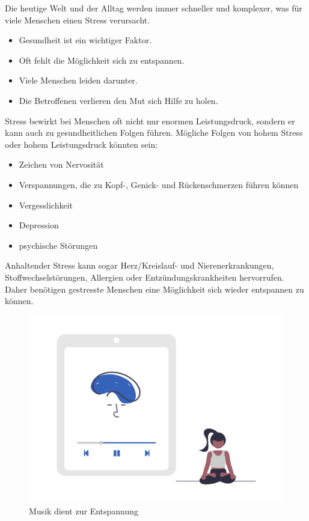 
Die heutige Welt und der Alltag werden immer schneller und komplexer,
was für viele Menschen einen Stress verursacht.

\begin{itemize}
    \item Gesundheit ist ein wichtiger Faktor.
    \item Oft fehlt die Möglichkeit sich zu entspannen.
    \item Viele Menschen leiden darunter.
    \item Die Betroffenen verlieren den Mut sich Hilfe zu holen.
\end{itemize}

Stress bewirkt bei Menschen oft nicht nur enormen Leistungsdruck, sondern er kann auch zu gesundheitlichen
Folgen führen. Mögliche Folgen von hohem Stress oder hohem Leistungsdruck könnten sein:

\begin{itemize}
    \item Zeichen von Nervosität
    \item Verspannungen, die zu Kopf-, Genick- und Rückenschmerzen führen können
    \item Vergesslichkeit
    \item Depression
    \item psychische Störungen
\end{itemize}

Anhaltender Stress kann sogar Herz/Kreislauf- und Nierenerkrankungen, Stoffwechselstörungen, Allergien oder
Entzündungskrankheiten hervorrufen. \cite{stress} Daher benötigen gestresste Menschen eine Möglichkeit sich
wieder entspannen zu können.

\begin{figure}[H]
    \centering
    \includegraphics[height=0.35\textwidth]{./pics/undraw_Meditating_re_aiqa.png}
    \caption{Musik dient zur Entspannung}
\end{figure}

